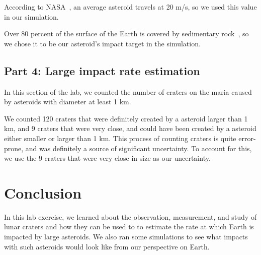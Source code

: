 \documentclass[11pt]{article}
\begin{document}
According to NASA~\cite{nasa-impact}, an average asteroid travels at 20 m/s, so we used this value in our simulation.

Over 80 percent of the surface of the Earth is covered by sedimentary rock~\cite{britannica-sedimentary}, so we chose it to be our asteroid's impact target in the simulation.


\subsection*{Part 4: Large impact rate estimation}
In this section of the lab, we counted the number of craters on the maria caused by asteroids with diameter at least 1 km.

We counted 120 craters that were definitely created by a asteroid larger than 1 km, and 9 craters that were very close, and could have been created by a asteroid either smaller or larger than 1 km.
This process of counting craters is quite error-prone, and was definitely a source of significant uncertainty.
To account for this, we use the 9 craters that were very close in size as our uncertainty.


\section{Conclusion}
In this lab exercise, we learned about the observation, measurement, and study of lunar craters and how they can be used to to estimate the rate at which Earth is impacted by large asteroids.
We also ran some simulations to see what impacts with such asteroids would look like from our perspective on Earth.


\printbibliography
\end{document}
